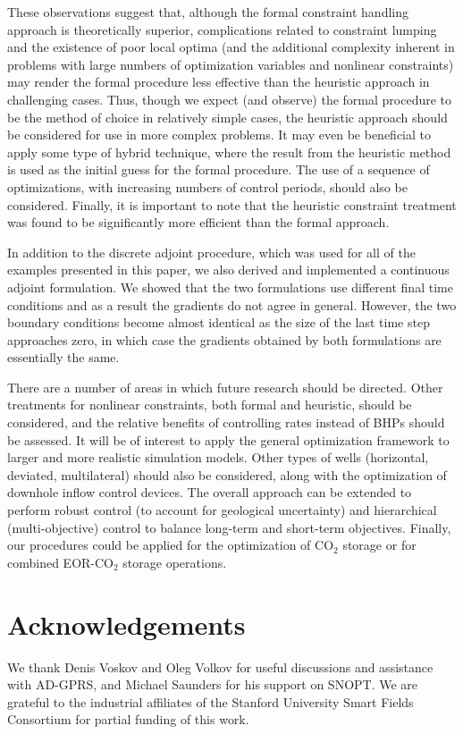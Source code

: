 These observations suggest that, although the formal constraint handling approach is theoretically superior, complications related to constraint lumping and the existence of poor local optima (and the additional complexity inherent in problems with large numbers of optimization variables and nonlinear constraints) may render the formal procedure less effective than the heuristic approach in challenging cases. Thus, though we expect (and observe) the formal procedure to be the method of choice in relatively simple cases, the heuristic approach should be considered for use in more complex problems. It may even be beneficial to apply some type of hybrid technique, where the result from the heuristic method is used as the initial guess for the formal procedure. The use of a sequence of optimizations, with increasing numbers of control periods, should also be considered. Finally, it is important to note that the heuristic constraint treatment was found to be significantly more efficient than the formal approach. 


In addition to the discrete adjoint procedure, which was used for all of the
examples presented in this paper, we also derived and implemented a continuous
adjoint formulation. We showed that the two formulations use different
final time conditions and as a result the gradients do not
agree in general. However, the two boundary conditions become almost identical as the
size of the last time step approaches zero, in which case the gradients obtained by
both formulations are essentially the same.

There are a number of areas in which future research should be directed. Other
treatments for nonlinear constraints, both formal and heuristic, should be
considered, and the relative benefits of controlling rates instead of BHPs
should be assessed. It will be of interest to apply the general optimization
framework to larger and more realistic simulation models. Other types of wells
(horizontal, deviated, multilateral) should also be considered, along with the
optimization of downhole inflow control devices. The overall approach can be 
extended to perform robust control (to account for geological uncertainty) and hierarchical
(multi-objective) control to balance long-term and short-term objectives. Finally, our procedures could be applied for the optimization of CO$_2$ storage or for combined
EOR-CO$_2$ storage operations.



\section*{Acknowledgements}
We thank Denis Voskov and Oleg Volkov for useful discussions and assistance with AD-GPRS, and
Michael Saunders for his support 
on SNOPT. We are grateful
to the industrial affiliates of the Stanford University Smart Fields Consortium for partial
funding of this work.
